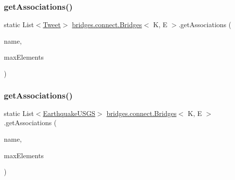 \hypertarget{classbridges_1_1connect_1_1_bridges_ad8f145f95222730fad3c0628b42f0128}{}\label{classbridges_1_1connect_1_1_bridges_ad8f145f95222730fad3c0628b42f0128} 
\subsubsection{\texorpdfstring{get\+Associations()}{getAssociations()}\hspace{0.1cm}{\footnotesize\ttfamily [1/2]}}
{\footnotesize\ttfamily static List$<$\hyperlink{classbridges_1_1data__src__dependent_1_1_tweet}{Tweet}$>$ \hyperlink{classbridges_1_1connect_1_1_bridges}{bridges.\+connect.\+Bridges}$<$ K, E $>$.get\+Associations (\begin{DoxyParamCaption}\item[{\hyperlink{classbridges_1_1data__src__dependent_1_1_twitter_account}{Twitter\+Account}}]{name,  }\item[{int}]{max\+Elements }\end{DoxyParamCaption})\hspace{0.3cm}{\ttfamily [static]}}

\hypertarget{classbridges_1_1connect_1_1_bridges_ac02211d6205c1270df11fcc271982d40}{}\label{classbridges_1_1connect_1_1_bridges_ac02211d6205c1270df11fcc271982d40} 
\subsubsection{\texorpdfstring{get\+Associations()}{getAssociations()}\hspace{0.1cm}{\footnotesize\ttfamily [2/2]}}
{\footnotesize\ttfamily static List$<$\hyperlink{classbridges_1_1data__src__dependent_1_1_earthquake_u_s_g_s}{Earthquake\+U\+S\+GS}$>$ \hyperlink{classbridges_1_1connect_1_1_bridges}{bridges.\+connect.\+Bridges}$<$ K, E $>$.get\+Associations (\begin{DoxyParamCaption}\item[{\hyperlink{classbridges_1_1data__src__dependent_1_1_u_s_g_saccount}{U\+S\+G\+Saccount}}]{name,  }\item[{int}]{max\+Elements }\end{DoxyParamCaption})\hspace{0.3cm}{\ttfamily [static]}}

